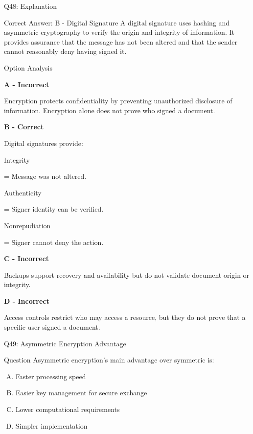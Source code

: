 \documentclass{beamer}
\begin{document}
	\begin{frame}[shrink=10]{Q48: Explanation}
		\footnotesize
		
		\begin{block}{Correct Answer: B - Digital Signature}
			A digital signature uses hashing and asymmetric cryptography
			to verify the origin and integrity of information. It provides
			assurance that the message has not been altered and that the
			sender cannot reasonably deny having signed it.
		\end{block}
		
		\begin{block}{Option Analysis}
			
			\textbf{A - Incorrect}
			
			Encryption protects confidentiality by preventing
			unauthorized disclosure of information. Encryption alone
			does not prove who signed a document.
			
			\vspace{0.15cm}
			
			\textbf{B - Correct}
			
			Digital signatures provide:
			
			Integrity
			
			= Message was not altered.
			
			Authenticity
			
			= Signer identity can be verified.
			
			Nonrepudiation
			
			= Signer cannot deny the action.
			
			\vspace{0.15cm}
			
			\textbf{C - Incorrect}
			
			Backups support recovery and availability but do not
			validate document origin or integrity.
			
			\vspace{0.15cm}
			
			\textbf{D - Incorrect}
			
			Access controls restrict who may access a resource,
			but they do not prove that a specific user signed
			a document.
			
		\end{block}
		

		
	\end{frame}
	
	
	\begin{frame}[shrink=10]{Q49: Asymmetric Encryption Advantage}
		\begin{block}{Question}
			Asymmetric encryption's main advantage over symmetric is:
		\end{block}
		\begin{enumerate}[(A)]
			\item Faster processing speed
			\item Easier key management for secure exchange
			\item Lower computational requirements
			\item Simpler implementation
		\end{enumerate}
	\end{frame}
	
\end{document}
